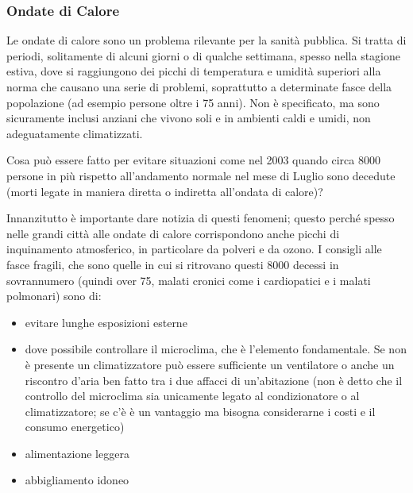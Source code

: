 \subsubsection{Ondate di Calore}


Le ondate di calore sono un problema rilevante per la sanità pubblica.
Si tratta di periodi, solitamente di alcuni giorni o di qualche
settimana, spesso nella stagione estiva, dove si raggiungono dei picchi
di temperatura e umidità superiori alla norma che causano una serie di
problemi, soprattutto a determinate fasce della popolazione (ad esempio
persone oltre i 75 anni). Non è specificato, ma sono sicuramente inclusi
anziani che vivono soli e in ambienti caldi e umidi, non adeguatamente
climatizzati.

Cosa può essere fatto per evitare situazioni come nel 2003 quando circa
8000 persone in più rispetto all'andamento normale nel mese di Luglio
sono decedute (morti legate in maniera diretta o indiretta all'ondata di
calore)?

Innanzitutto è importante dare notizia di questi fenomeni; questo perché
spesso nelle grandi città alle ondate di calore corrispondono anche
picchi di inquinamento atmosferico, in particolare da polveri e da
ozono. I consigli alle fasce fragili, che sono quelle in cui si
ritrovano questi 8000 decessi in sovrannumero (quindi over 75, malati
cronici come i cardiopatici e i malati polmonari) sono di:

\begin{itemize}
\item

  evitare lunghe esposizioni esterne

\item

  dove possibile controllare il microclima, che è l'elemento
  fondamentale. Se non è presente un climatizzatore può essere
  sufficiente un ventilatore o anche un riscontro d'aria ben fatto tra i
  due affacci di un'abitazione (non è detto che il controllo del
  microclima sia unicamente legato al condizionatore o al
  climatizzatore; se c'è è un vantaggio ma bisogna considerarne i costi
  e il consumo energetico)

\item
   
  alimentazione leggera
   
\item
   
  abbigliamento idoneo
   
\end{itemize}

